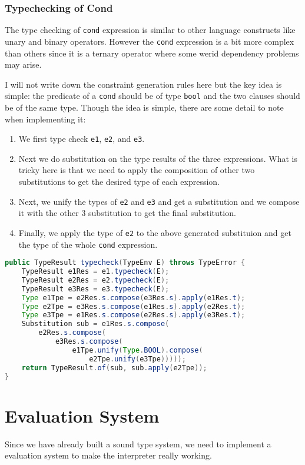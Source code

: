 \documentclass{article}
\begin{document}
\subsubsection{Typechecking of Cond}
The type checking of \verb|cond| expression is similar to other language constructs like unary and binary operators. However the \verb|cond| expression is a bit more complex than others since it is a ternary operator where some werid dependency problems may arise.

I will not write down the constraint generation rules here but the key idea is simple: the predicate of a \verb|cond| should be of type \verb|bool| and the two clauses should be of the same type. Though the idea is simple, there are some detail to note when implementing it:
\begin{enumerate}
	\item We first type check \verb|e1|, \verb|e2|, and \verb|e3|.
	\item Next we do substitution on the type results of the three expressions. What is tricky here is that we need to apply the composition of other two substitutions to get the desired type of each expression.
	\item Next, we unify the types of \verb|e2| and \verb|e3| and get a substitution and we compose it with the other 3 substitution to get the final substitution.
	\item Finally, we apply the type of \verb|e2| to the above generated substituion and get the type of the whole \verb|cond| expression.
\end{enumerate}
\newpage
\begin{lstlisting}[language=Java, caption=Type Checking of Cond]
public TypeResult typecheck(TypeEnv E) throws TypeError {
	TypeResult e1Res = e1.typecheck(E);
	TypeResult e2Res = e2.typecheck(E);
	TypeResult e3Res = e3.typecheck(E);
	Type e1Tpe = e2Res.s.compose(e3Res.s).apply(e1Res.t);
	Type e2Tpe = e3Res.s.compose(e1Res.s).apply(e2Res.t);
	Type e3Tpe = e1Res.s.compose(e2Res.s).apply(e3Res.t);
	Substitution sub = e1Res.s.compose(
		e2Res.s.compose(
			e3Res.s.compose(
				e1Tpe.unify(Type.BOOL).compose(
					e2Tpe.unify(e3Tpe)))));
	return TypeResult.of(sub, sub.apply(e2Tpe));
}
\end{lstlisting}


\section{Evaluation System}
Since we have already built a sound type system, we need to implement a evaluation system to make the interpreter really working.
\end{document}
